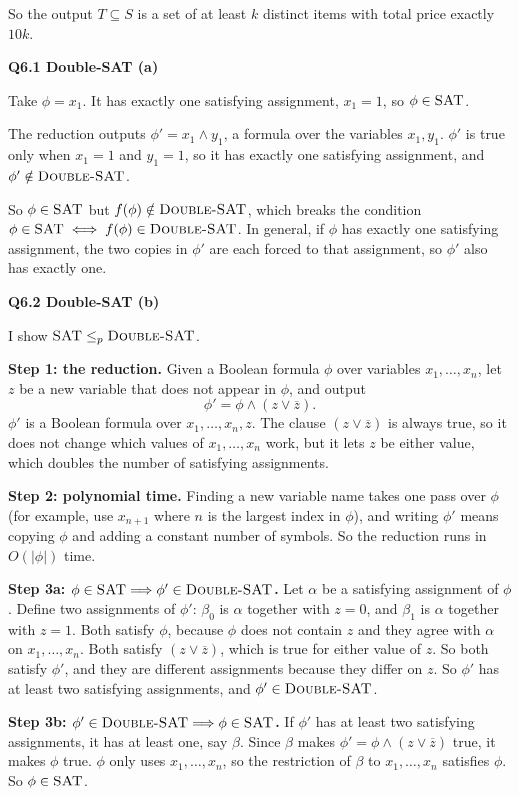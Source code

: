 \documentclass[11pt]{article}
\newcommand{\abs}[1]{\left|#1\right|}
\newcommand{\lp}{\leq_p}
\newcommand{\cproblem}[1]{\textsc{#1}}
\newcommand{\SAT}{\cproblem{SAT}}
\newcommand{\DSAT}{\cproblem{Double-SAT}}
\newcommand{\qpage}[1]{\clearpage\noindent\textbf{\large #1}\par\medskip}
\begin{document}
So the output $T \subseteq S$ is a set of at least $k$ distinct items with total price exactly $10k$.

\qpage{Q6.1 Double-SAT (a)}

Take $\phi = x_1$.
It has exactly one satisfying assignment, $x_1 = 1$, so $\phi \in \SAT$.

The reduction outputs $\phi' = x_1 \wedge y_1$, a formula over the variables $x_1, y_1$.
$\phi'$ is true only when $x_1 = 1$ and $y_1 = 1$, so it has exactly one satisfying assignment, and $\phi' \notin \DSAT$.

So $\phi \in \SAT$ but $f(\phi) \notin \DSAT$, which breaks the condition $\phi \in \SAT \iff f(\phi) \in \DSAT$.
In general, if $\phi$ has exactly one satisfying assignment, the two copies in $\phi'$ are each forced to that assignment, so $\phi'$ also has exactly one.

\qpage{Q6.2 Double-SAT (b)}

I show $\SAT \lp \DSAT$.

\textbf{Step 1: the reduction.}
Given a Boolean formula $\phi$ over variables $x_1, \ldots, x_n$, let $z$ be a new variable that does not appear in $\phi$, and output
\[
  \phi' = \phi \wedge (z \vee \overline{z}).
\]
$\phi'$ is a Boolean formula over $x_1, \ldots, x_n, z$.
The clause $(z \vee \overline{z})$ is always true, so it does not change which values of $x_1, \ldots, x_n$ work, but it lets $z$ be either value, which doubles the number of satisfying assignments.

\textbf{Step 2: polynomial time.}
Finding a new variable name takes one pass over $\phi$ (for example, use $x_{n+1}$ where $n$ is the largest index in $\phi$), and writing $\phi'$ means copying $\phi$ and adding a constant number of symbols.
So the reduction runs in $O(\abs{\phi})$ time.

\textbf{Step 3a: $\phi \in \SAT \Longrightarrow \phi' \in \DSAT$.}
Let $\alpha$ be a satisfying assignment of $\phi$.
Define two assignments of $\phi'$: $\beta_0$ is $\alpha$ together with $z = 0$, and $\beta_1$ is $\alpha$ together with $z = 1$.
Both satisfy $\phi$, because $\phi$ does not contain $z$ and they agree with $\alpha$ on $x_1, \ldots, x_n$.
Both satisfy $(z \vee \overline{z})$, which is true for either value of $z$.
So both satisfy $\phi'$, and they are different assignments because they differ on $z$.
So $\phi'$ has at least two satisfying assignments, and $\phi' \in \DSAT$.

\textbf{Step 3b: $\phi' \in \DSAT \Longrightarrow \phi \in \SAT$.}
If $\phi'$ has at least two satisfying assignments, it has at least one, say $\beta$.
Since $\beta$ makes $\phi' = \phi \wedge (z \vee \overline{z})$ true, it makes $\phi$ true.
$\phi$ only uses $x_1, \ldots, x_n$, so the restriction of $\beta$ to $x_1, \ldots, x_n$ satisfies $\phi$.
So $\phi \in \SAT$.
\end{document}
